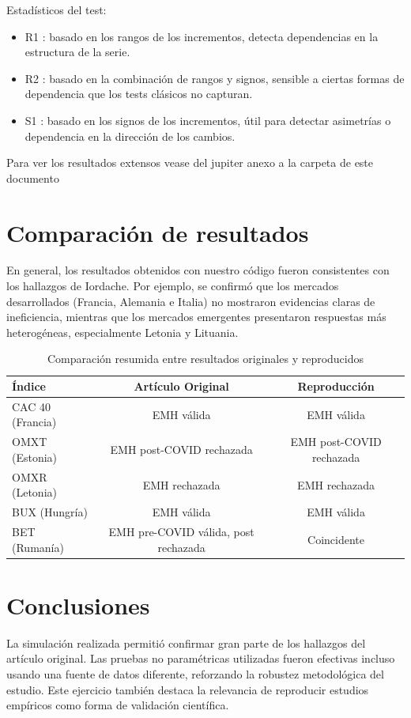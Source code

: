 \documentclass[12pt]{article}
\begin{document}
{\large Estadísticos del test:}

\begin{itemize}
\item R1 : basado en los rangos de los incrementos, detecta dependencias en la estructura de la serie.

\item R2 : basado en la combinación de rangos y signos, sensible a ciertas formas de dependencia que los tests clásicos no capturan.

\item S1 : basado en los signos de los incrementos, útil para detectar asimetrías o dependencia en la dirección de los cambios.

\end{itemize}

Para ver los resultados extensos vease del jupiter anexo a la carpeta de este documento


\section{Comparación de resultados}
En general, los resultados obtenidos con nuestro código fueron consistentes con los hallazgos de Iordache. Por ejemplo, se confirmó que los mercados desarrollados (Francia, Alemania e Italia) no mostraron evidencias claras de ineficiencia, mientras que los mercados emergentes presentaron respuestas más heterogéneas, especialmente Letonia y Lituania.

\begin{table}[H]
\centering
\begin{tabular}{|l|c|c|}
\hline
\textbf{Índice} & \textbf{Artículo Original} & \textbf{Reproducción}\\
\hline
CAC 40 (Francia) & EMH válida & EMH válida\\
OMXT (Estonia) & EMH post-COVID rechazada & EMH post-COVID rechazada\\
OMXR (Letonia) & EMH rechazada & EMH rechazada\\
BUX (Hungría) & EMH válida & EMH válida\\
BET (Rumanía) & EMH pre-COVID válida, post rechazada & Coincidente\\
\hline
\end{tabular}
\caption{Comparación resumida entre resultados originales y reproducidos}
\end{table}

\section{Conclusiones}
La simulación realizada permitió confirmar gran parte de los hallazgos del artículo original. Las pruebas no paramétricas utilizadas fueron efectivas incluso usando una fuente de datos diferente, reforzando la robustez metodológica del estudio. Este ejercicio también destaca la relevancia de reproducir estudios empíricos como forma de validación científica.
\end{document}
